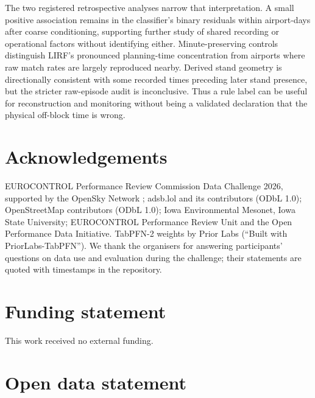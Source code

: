 \documentclass[11pt,a4paper]{article}
\begin{document}
The two registered retrospective analyses narrow that interpretation. A small positive association remains in the classifier's binary residuals within airport-days after coarse conditioning, supporting further study of shared recording or operational factors without identifying either. Minute-preserving controls distinguish LIRF's pronounced planning-time concentration from airports where raw match rates are largely reproduced nearby. Derived stand geometry is directionally consistent with some recorded times preceding later stand presence, but the stricter raw-episode audit is inconclusive. Thus a rule label can be useful for reconstruction and monitoring without being a validated declaration that the physical off-block time is wrong.

\section*{Acknowledgements}\label{acknowledgements}

EUROCONTROL Performance Review Commission Data Challenge 2026, supported by the OpenSky Network \autocite{schafer2014opensky}; adsb.lol and its contributors (ODbL 1.0); \textcopyright{} OpenStreetMap contributors (ODbL 1.0); Iowa Environmental Mesonet, Iowa State University; EUROCONTROL Performance Review Unit and the Open Performance Data Initiative. TabPFN-2 weights by Prior Labs (``Built with PriorLabs-TabPFN''). We thank the organisers for answering participants' questions on data use and evaluation during the challenge; their statements are quoted with timestamps in the repository.

\section*{Funding statement}\label{funding-statement}

This work received no external funding.

\section*{Open data statement}\label{open-data-statement}
\end{document}
